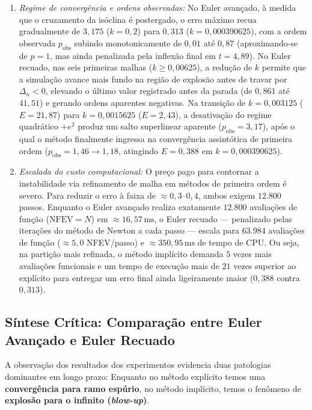 \documentclass[12pt, a4paper]{article}
\begin{document}
\begin{enumerate}
  \item \emph{Regime de convergência e ordens observadas:} No Euler avançado, à medida que o cruzamento da isóclina é postergado, o erro máximo recua gradualmente de $3{,}175$ ($k = 0{,}2$) para $0{,}313$ ($k = 0{,}000390625$), com a ordem observada $p_{\text{obs}}$ subindo monotonicamente de $0{,}01$ até $0{,}87$ (aproximando-se de $p = 1$, mas ainda penalizada pela inflexão final em $t = 4{,}89$). No Euler recuado, nas seis primeiras malhas ($k \ge 0{,}00625$), a redução de $k$ permite que a simulação avance mais fundo na região de explosão antes de travar por $\Delta_n < 0$, elevando o último valor registrado antes da parada (de $0{,}861$ até $41{,}51$) e gerando ordens aparentes negativas. Na transição de $k = 0{,}003125$ ($E = 21{,}87$) para $k = 0{,}0015625$ ($E = 2{,}43$), a desativação do regime quadrático $+e^2$ produz um salto superlinear aparente ($p_{\text{obs}} = 3{,}17$), após o qual o método finalmente ingressa na convergência assintótica de primeira ordem ($p_{\text{obs}} = 1{,}46 \to 1{,}18$, atingindo $E = 0{,}388$ em $k = 0{,}000390625$).
  \item \emph{Escalada do custo computacional:} O preço pago para contornar a instabilidade via refinamento de malha em métodos de primeira ordem é severo. Para reduzir o erro à faixa de $\approx 0{,}3\text{--}0{,}4$, ambos exigem $12.800$ passos. Enquanto o Euler avançado realiza exatamente $12.800$ avaliações de função ($\text{NFEV} = N$) em $\approx 16{,}57\,\text{ms}$, o Euler recuado — penalizado pelas iterações do método de Newton a cada passo — escala para $63.984$ avaliações de função ($\approx 5{,}0$ NFEV/passo) e $\approx 350{,}95\,\text{ms}$ de tempo de CPU. Ou seja, na partição mais refinada, o método implícito demanda $5$ vezes mais avaliações funcionais e um tempo de execução mais de $21$ vezes superior ao explícito para entregar um erro final ainda ligeiramente maior ($0{,}388$ contra $0{,}313$).
\end{enumerate}

\subsection{Síntese Crítica: Comparação entre Euler Avançado e Euler Recuado}
\label{sec:a-sintese}

A observação dos resultados dos experimentos evidencia duas patologias dominantes em longo prazo: Enquanto no método explícito temos uma \textbf{convergência para ramo espúrio}, no método implícito, temos o fenômeno de \textbf{explosão para o infinito (\emph{blow-up})}.
\end{document}
